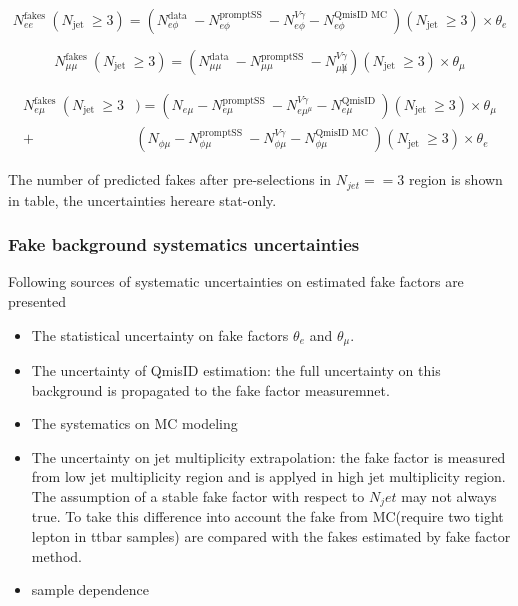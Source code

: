 \begin{equation}
N_{e e}^{\text {fakes }}\left(N_{\text {jet }} \geq 3\right)=\left(N_{e \phi}^{\text {data }}-N_{e \phi}^{\text {promptSS }}-N_{e \phi}^{V \gamma}-N_{e \phi}^{\text {QmisID MC }}\right)\left(N_{\text {jet }} \geq 3\right) \times \theta_{e}
\end{equation}

\begin{equation}
N_{\mu \mu}^{\text {fakes }}\left(N_{\text {jet }} \geq 3\right)=\left(N_{\mu \mu}^{\text {data }}-N_{\mu \mu}^{\text {promptSS }}-N_{\mu \not h}^{V \gamma}\right)\left(N_{\text {jet }} \geq 3\right) \times \theta_{\mu}
\end{equation}

\begin{equation}
\begin{aligned}
N_{e \mu}^{\text {fakes }}\left(N_{\text {jet }} \geq 3\right.&)=\left(N_{e \mu}-N_{e \mu}^{\text {promptSS }}-N_{e \mu^{\mu}}^{V \gamma}-N_{e \mu}^{\text {QmisID }}\right)\left(N_{\text {jet }} \geq 3\right) \times \theta_{\mu} \\
	+&\left(N_{\phi \mu}-N_{\phi \mu}^{\text {promptSS }}-N_{\phi \mu}^{V \gamma}-N_{\phi \mu}^{\text {QmisID MC }}\right)\left(N_{\text {jet }} \geq 3\right) \times \theta_{e}
\end{aligned}
\end{equation}

The number of predicted fakes after pre-selections in $N_{jet}==3$ region is shown in table, the uncertainties hereare stat-only. 
\subsubsection{Fake background systematics uncertainties}
Following sources of systematic uncertainties on estimated fake factors are presented

\begin{itemize}
\item The statistical uncertainty on fake factors $\theta_e$ and $\theta_{\mu}$. 
\item The uncertainty of QmisID estimation: the full uncertainty on this background is propagated to the fake factor measuremnet.
\item The systematics on MC modeling 
\item The uncertainty on jet multiplicity extrapolation: the fake factor is measured from low jet multiplicity region and is applyed in high jet multiplicity region. The assumption of a stable fake factor with respect to $N_jet$ may not always true. To take this difference into account the fake from MC(require two tight lepton in ttbar samples) are compared with the fakes estimated by fake factor method. 
\item sample dependence
\end{itemize}
